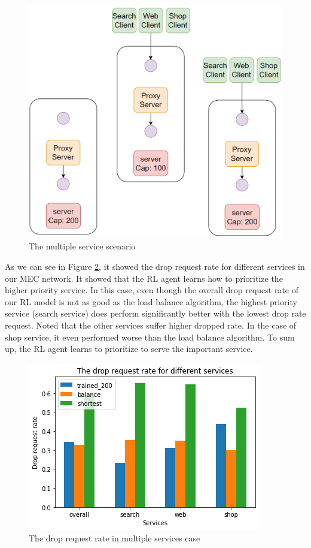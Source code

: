 \documentclass[conference]{IEEEtran}
\begin{document}
\begin{figure}[]
    \centering
    \includegraphics[scale = 0.5]{imgs/multiple_service_scenario.png}
    \caption{The multiple service scenario}
    \label{fig:multiple_service_scenario}
\end{figure}

As we can see in Figure \ref{fig:multiple_service_drop_request_rate_result}, it showed the drop request rate for different services in our MEC network. It showed that the RL agent learns how to prioritize the higher priority service. In this case, even though the overall drop request rate of our RL model is not as good as the load balance algorithm, the highest priority service (search service) does perform significantly better with the lowest drop rate request. Noted that the other services suffer higher dropped rate. In the case of shop service, it even performed worse than the load balance algorithm. To sum up, the RL agent learns to prioritize to serve the important service. 

\begin{figure}[]
    \centering
    \includegraphics[scale = 0.5]{imgs/multiple_service_drop_request_rate_result.png}
    \caption{The drop request rate in multiple services case}
    \label{fig:multiple_service_drop_request_rate_result}
\end{figure}
\end{document}
